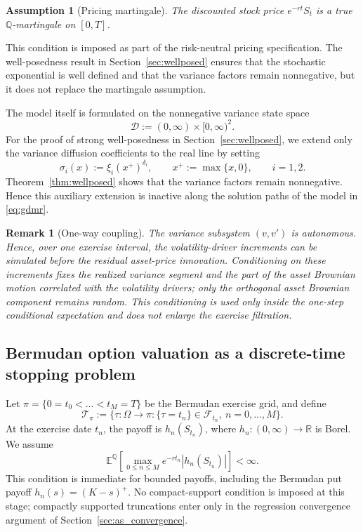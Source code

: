 \documentclass[pdflatex,sn-mathphys-num]{sn-jnl}
\theoremstyle{thmstyleone}%
\theoremstyle{thmstylethree}%
\newtheorem{assumption}[theorem]{Assumption}
\theoremstyle{thmstyletwo}%
\newtheorem{remark}[theorem]{Remark}
\newcommand{\E}{\mathbb E}
\newcommand{\Q}{\mathbb Q}
\newcommand{\R}{\mathbb R}
\newcommand{\F}{\mathcal F}
\begin{document}
\begin{assumption}[Pricing martingale]\label{ass:pricing-martingale}
The discounted stock price $e^{-rt}S_t$ is a true $\Q$-martingale on $[0,T]$.
\end{assumption}

This condition is imposed as part of the risk-neutral pricing specification. The
well-posedness result in Section~\ref{sec:wellposed} ensures that the stochastic
exponential is well defined and that the variance factors remain nonnegative,
but it does not replace the martingale assumption.

The model itself is formulated on the nonnegative variance state space
\[
\mathcal D:=(0,\infty)\times[0,\infty)^2.
\]
For the proof of strong well-posedness in Section~\ref{sec:wellposed}, we
extend only the variance diffusion coefficients to the real line by setting
\[
\sigma_i(x):=\xi_i(x^+)^{\delta_i},\qquad
x^+:=\max\{x,0\},\qquad i=1,2.
\]
Theorem~\ref{thm:wellposed} shows that the variance factors remain
nonnegative. Hence this auxiliary extension is inactive along the solution paths
of the model in \eqref{eq:gdmr}.

\begin{remark}[One-way coupling]\label{rem:one-way}
The variance subsystem $(v,v')$ is autonomous. Hence, over one exercise
interval, the volatility-driver increments can be simulated before the residual
asset-price innovation. Conditioning on these increments fixes the realized
variance segment and the part of the asset Brownian motion correlated with the
volatility drivers; only the orthogonal asset Brownian component remains random.
This conditioning is used only inside the one-step conditional expectation and
does not enlarge the exercise filtration.
\end{remark}

\subsection{Bermudan option valuation as a discrete-time stopping problem}

Let $\pi=\{0=t_0<\dots<t_M=T\}$ be the Bermudan exercise grid, and define
\[
\mathcal T_\pi:=
\{\tau:\Omega\to\pi:\{\tau=t_n\}\in\F_{t_n},\ n=0,\dots,M\}.
\]
At the exercise date $t_n$, the payoff is $h_n(S_{t_n})$, where $h_n:(0,\infty)\to\R$ is Borel. We assume
\[
\E^\Q\!\left[\max_{0\le n\le M} e^{-rt_n}|h_n(S_{t_n})|\right]<\infty.
\]
This condition is immediate for bounded payoffs, including the Bermudan put
payoff $h_n(s)=(K-s)^+$. No compact-support condition is imposed at this stage;
compactly supported truncations enter only in the regression convergence
argument of Section~\ref{sec:as_convergence}.
\end{document}
